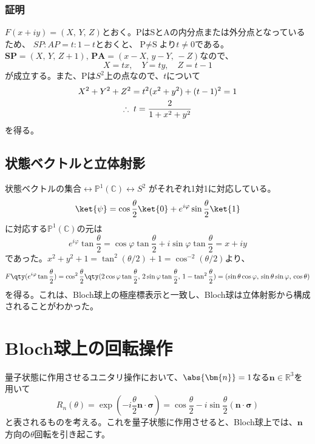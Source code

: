 \documentclass[a4paper,11pt,uplatex]{jsarticle}%
\begin{document}
\subsubsection*{証明}
$F(x+iy)=(X,\,Y,\,Z)$とおく。PはSとAの内分点または外分点となっているため、
$SP:AP=t:1-t$とおくと、$\text{P}\neq\text{S}$より$t\neq 0$である。
$\bm{SP} = (X,\,Y,\,Z+1),\,\bm{PA}=(x-X,\,y-Y,\,-Z)$なので、
\begin{equation}
  X=tx,\quad Y=ty,\quad Z=t-1
\end{equation}
が成立する。また、Pは$S^2$上の点なので、$t$について
\begin{gather}
  X^2+Y^2+Z^2 = t^2(x^2+y^2)+(t-1)^2 = 1 \notag \\
  \therefore\; t=\frac{2}{1+x^2+y^2}
\end{gather}
を得る。

\subsection{状態ベクトルと立体射影}
$\text{状態ベクトルの集合}\longleftrightarrow \mathbb{P}^1(\mathbb{C})\longleftrightarrow S^2$
がそれぞれ1対1に対応している。
\begin{equation}
  \ket{\psi} = \cos\frac{\theta}{2}\ket{0} + e^{i\varphi}\sin\frac{\theta}{2}\ket{1}
\end{equation}
に対応する$\mathbb{P}^1(\mathbb{C})$の元は
\begin{equation}
  e^{i\varphi}\tan\frac{\theta}{2} = \cos\varphi\tan\frac{\theta}{2} + i\sin\varphi\tan\frac{\theta}{2} = x + iy
\end{equation}
であった。$x^2+y^2+1 = \tan^2(\theta/2) + 1 = \cos^{-2}(\theta/2)$より、
\begin{equation}
  F\qty(e^{i\varphi}\tan\frac{\theta}{2}) 
  = \cos^2\frac{\theta}{2}\qty(2\cos\varphi\tan\frac{\theta}{2},\,2\sin\varphi\tan\frac{\theta}{2},\,1-\tan^2\frac{\theta}{2})
  = (\sin\theta\cos\varphi,\,\sin\theta\sin\varphi,\,\cos\theta)
\end{equation}
を得る。これは、Bloch球上の極座標表示と一致し、Bloch球は立体射影から構成されることがわかった。

\newpage
\section{Bloch球上の回転操作}
量子状態に作用させるユニタリ操作において、$\abs{\bm{n}}=1$なる$\bm{n}\in\mathbb{R}^3$を用いて
\begin{equation}
  R_n(\theta) = \exp(-i\frac{\theta}{2}\bm{n}\cdot\bm{\sigma}) = \cos\frac{\theta}{2}-i\sin\frac{\theta}{2}(\bm{n\cdot\bm{\sigma}})
\end{equation}
と表されるものを考える。これを量子状態に作用させると、Bloch球上では、$\bm{n}$方向の$\theta$回転を引き起こす。
\end{document}
